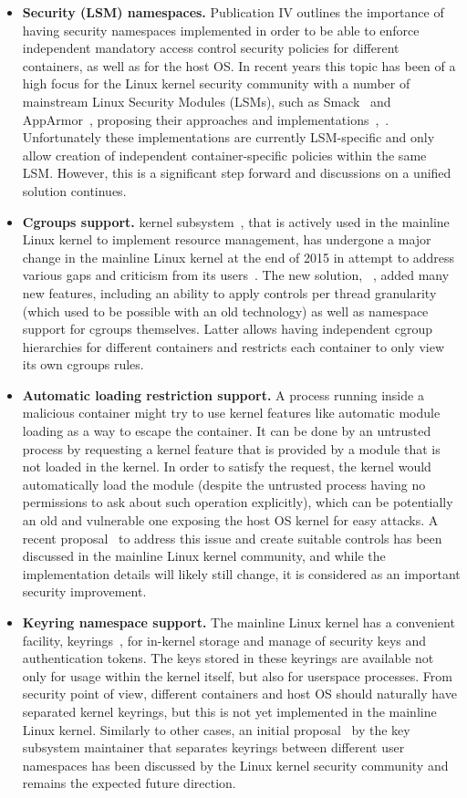 \begin{itemize}
	\item \textbf{Security (LSM) namespaces.} Publication IV outlines the importance of having security namespaces implemented in order to be able to enforce independent mandatory access control security policies for different containers, as well as for the host OS. In recent years this topic has been of a high focus for the Linux kernel security community with a number of mainstream Linux Security Modules (LSMs), such as Smack~\cite{smack} and AppArmor~\cite{bauer2006paranoid}, proposing their approaches and implementations~\cite{smackns},~\cite{tbd}. Unfortunately these implementations are currently LSM-specific and only allow creation of independent container-specific policies within the same LSM. However, this is a significant step forward and discussions on a unified solution continues.
	\item \textbf{Cgroups support.}  kernel subsystem~\cite{cgroupsv2}, that is actively used in the mainline Linux kernel to implement resource management, has undergone a major change in the mainline Linux kernel at the end of 2015 in attempt to address various gaps and criticism from its users~\cite{rosen2016}. The new solution, ~\cite{cgroupsv2}, added many new features, including an ability to apply controls per thread granularity (which used to be possible with an old  technology) as well as namespace support for cgroups themselves. Latter allows having independent cgroup hierarchies for different containers and restricts each container to only view its own cgroups rules. 
	\item \textbf{Automatic loading restriction support.} A process running inside a malicious container might try to use kernel features like automatic module loading as a way to escape the container. It can be done by an untrusted process by requesting a kernel feature that is provided by a module that is not loaded in the kernel. In order to satisfy the request, the kernel would automatically load the module (despite the untrusted process having no permissions to ask about such operation explicitly), which can be potentially an old and vulnerable one exposing the host OS kernel for easy attacks. A recent proposal~\cite{harouni2017} to address this issue and create suitable controls has been discussed in the mainline Linux kernel community, and while the implementation details will likely still change, it is considered as an important security improvement. 
  \item \textbf{Keyring namespace support.} The mainline Linux kernel has a convenient facility, keyrings~\cite{keyrings}, for in-kernel storage and manage of security keys and authentication tokens. The keys stored in these keyrings are available not only for usage within the kernel itself, but also for userspace processes. From security point of view, different containers and host OS should naturally have separated kernel keyrings, but this is not yet implemented in the mainline Linux kernel. Similarly to other cases, an initial proposal~\cite{howells2016} by the key subsystem maintainer that separates keyrings between different user namespaces has been discussed by the Linux kernel security community and remains the expected future direction. 

\end{itemize}
